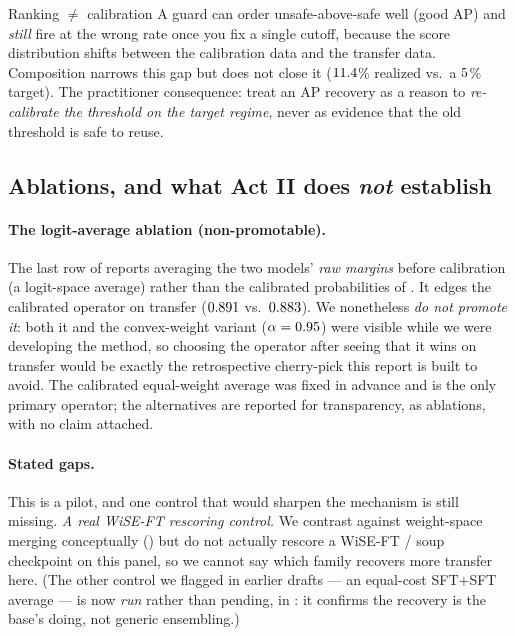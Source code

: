

\begin{takeaway}{Ranking $\neq$ calibration}
A guard can order unsafe-above-safe well (good AP) and \emph{still} fire at the wrong rate once you
fix a single cutoff, because the score distribution shifts between the calibration data and the
transfer data. Composition narrows this gap but does not close it
($11.4$\% realized vs.\ a $5$\% target). The
practitioner consequence: treat an AP recovery as a reason to \emph{re-calibrate the threshold on
the target regime}, never as evidence that the old threshold is safe to reuse.
\end{takeaway}

\subsection{Ablations, and what Act II does \emph{not} establish}
\label{sec:actIII-ablations}

\paragraph{The logit-average ablation (non-promotable).}
The last row of  reports averaging the two models' \emph{raw margins}
before calibration (a logit-space average) rather than the calibrated probabilities of
. It edges the calibrated operator on transfer ($0.891$ vs.\
$0.883$). We nonetheless \emph{do not promote it}: both it and the convex-weight
variant ($\alpha=0.95$) were visible while we were developing the method, so choosing
the operator after seeing that it wins on transfer would be exactly the retrospective cherry-pick
this report is built to avoid. The calibrated equal-weight average was fixed in advance and is the
only primary operator; the alternatives are reported for transparency, as ablations, with no claim
attached.

\paragraph{Stated gaps.}
This is a pilot, and one control that would sharpen the mechanism is still missing.
\emph{A real WiSE-FT rescoring control.} We contrast against weight-space merging conceptually
(\Cref{sec:actIII-weightspace}) but do not actually rescore a WiSE-FT / soup checkpoint on this panel, so
we cannot say which family recovers more transfer here. (The other control we flagged in earlier drafts ---
an equal-cost SFT$+$SFT average --- is now \emph{run} rather than pending, in \Cref{sec:actIII-sftsft}: it
confirms the recovery is the base's doing, not generic ensembling.)

